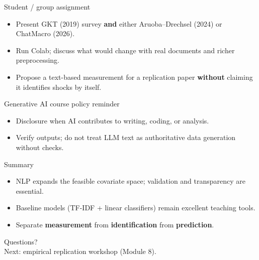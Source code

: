 \documentclass[aspectratio=169,11pt]{beamer}
\begin{document}
\begin{frame}{Student / group assignment}
  \begin{itemize}
    \item Present GKT (2019) survey \textbf{and} either Aruoba--Drechsel (2024) or ChatMacro (2026).
    \item Run Colab; discuss what would change with real documents and richer preprocessing.
    \item Propose a text-based measurement for a replication paper \textbf{without} claiming it identifies shocks by itself.
  \end{itemize}
\end{frame}

\begin{frame}{Generative AI course policy reminder}
  \begin{itemize}
    \item Disclosure when AI contributes to writing, coding, or analysis.
    \item Verify outputs; do not treat LLM text as authoritative data generation without checks.
  \end{itemize}
\end{frame}

\begin{frame}{Summary}
  \begin{itemize}
    \item NLP expands the feasible covariate space; validation and transparency are essential.
    \item Baseline models (TF-IDF + linear classifiers) remain excellent teaching tools.
    \item Separate \textbf{measurement} from \textbf{identification} from \textbf{prediction}.
  \end{itemize}
\end{frame}

\begin{frame}[plain]
  \begin{center}
    \Large Questions?\\[0.8em]
    \normalsize Next: empirical replication workshop (Module 8).
  \end{center}
\end{frame}
\end{document}
